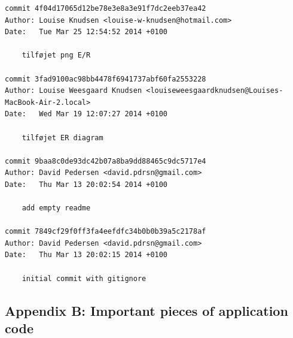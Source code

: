\documentclass[12pt]{article}
\begin{document}
\begin{verbatim}
commit 4f04d17065d12be78e3e8a3e91f7dc2eeb37ea42
Author: Louise Knudsen <louise-w-knudsen@hotmail.com>
Date:   Tue Mar 25 12:54:52 2014 +0100

    tilføjet png E/R

commit 3fad9100ac98bb4478f6941737abf60fa2553228
Author: Louise Weesgaard Knudsen <louiseweesgaardknudsen@Louises-MacBook-Air-2.local>
Date:   Wed Mar 19 12:07:27 2014 +0100

    tilføjet ER diagram

commit 9baa8c0de93dc42b07a8ba9dd88465c9dc5717e4
Author: David Pedersen <david.pdrsn@gmail.com>
Date:   Thu Mar 13 20:02:54 2014 +0100

    add empty readme

commit 7849cf29f0ff3fa4eefdfc34b0b0b39a5c2178af
Author: David Pedersen <david.pdrsn@gmail.com>
Date:   Thu Mar 13 20:02:15 2014 +0100

    initial commit with gitignore

\end{verbatim}
\subsection{Appendix B: Important pieces of application code}
\end{document}
